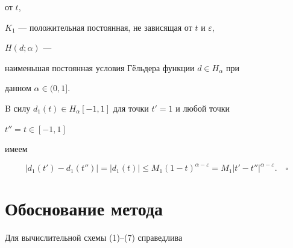 от $t$, 


$K_1$ --- положительная постоянная, не зависящая от $t$ и $\varepsilon$, 


$H(d;\alpha)$ --- 


наименьшая постоянная условия Г\"ельдера функции $d\in H_\alpha$ при 


данном $\alpha\in(0,1]$. 


 


B силу $d_1(t)\in H_\alpha[-1,1]$ для точки $t'=1$ и любой точки 


$t''=t\in[-1,1]$ 


имеем 


$$ 


|d_1(t')-d_1(t'')|=|d_1(t)|\le M_1(1-t)^{\alpha-\varepsilon} 


=M_1|t'-t''|^{\alpha-\varepsilon}.\quad\square 


$$ 


 


 


\section{Обоснование метода} 


 


Для вычислительной схемы (1)--(7) справедлива 


 


